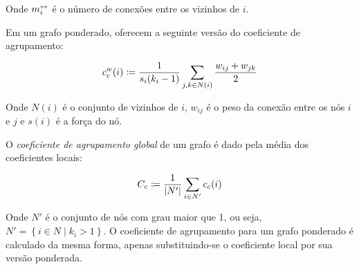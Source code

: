 \documentclass[12pt,a4paper]{article}
\begin{document}
Onde $m^\leftrightarrow_i$ é o número de conexões entre os vizinhos de $i$.

Em um grafo ponderado,  oferecem a seguinte versão do coeficiente de agrupamento:

\begin{equation}
c^w_c(i) \coloneqq \frac{1}{s_i(k_i - 1)} \sum_{j,k \in N(i)} \frac{w_{ij} + w_{jk}}{2}
\end{equation}

Onde $N(i)$ é o conjunto de vizinhos de $i$, $w_{ij}$ é o peso da conexão entre os nós $i$ e $j$ e $s(i)$ é a força do nó.

O \textit{coeficiente de agrupamento global} de um grafo é dado pela média dos coeficientes locais:

\begin{equation}
C_c \coloneqq \frac{1}{|N'|} \sum_{i \in N'} c_c(i)
\end{equation}

Onde $N'$ é o conjunto de nós com grau maior que 1, ou seja, $N' = \left\lbrace i \in N \mid k_i > 1 \right\rbrace$. O coeficiente de agrupamento para um grafo ponderado é calculado da mesma forma, apenas substituindo-se o coeficiente local por sua versão ponderada.
\end{document}
